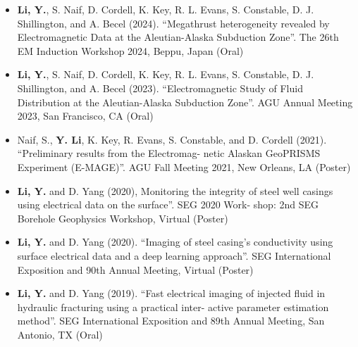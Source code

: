 

\begin{cvparagraph}

  \fontsize{11pt}{1.3em}\selectfont
  \begin{itemize}[leftmargin=2.5ex]
    \item {\textbf{Li, Y.}, S. Naif, D. Cordell, K. Key, R. L. Evans, S. Constable, D. J. Shillington, and A. Becel (2024). “Megathrust heterogeneity 
    revealed by Electromagnetic Data at the Aleutian-Alaska Subduction Zone”. The 26th EM Induction Workshop 2024, Beppu, Japan (Oral)}
    \item {\textbf{Li, Y.}, S. Naif, D. Cordell, K. Key, R. L. Evans, S. Constable, D. J. Shillington, and A. Becel (2023). “Electromagnetic Study
    of Fluid Distribution at the Aleutian-Alaska Subduction Zone”. AGU Annual Meeting 2023, San Francisco, CA (Oral)}
    \item {Naif, S., \textbf{Y. Li}, K. Key, R. Evans, S. Constable, and D. Cordell (2021). “Preliminary results from the Electromag-
    netic Alaskan GeoPRISMS Experiment (E-MAGE)”. AGU Fall Meeting 2021, New Orleans, LA (Poster)}
    \item {\textbf{Li, Y.} and D. Yang (2020), Monitoring the integrity of steel well casings using electrical data on the surface”. SEG 2020 Work-
    shop: 2nd SEG Borehole Geophysics Workshop, Virtual (Poster)}
    \item {\textbf{Li, Y.} and D. Yang (2020). “Imaging of steel casing’s conductivity using surface electrical data and a deep learning
    approach”. SEG International Exposition and 90th Annual Meeting, Virtual (Poster)}
    \item {\textbf{Li, Y.} and D. Yang (2019). “Fast electrical imaging of injected fluid in hydraulic fracturing using a practical inter-
    active parameter estimation method”. SEG International Exposition and 89th Annual Meeting, San Antonio, TX (Oral)}
  \end{itemize}


\end{cvparagraph}
